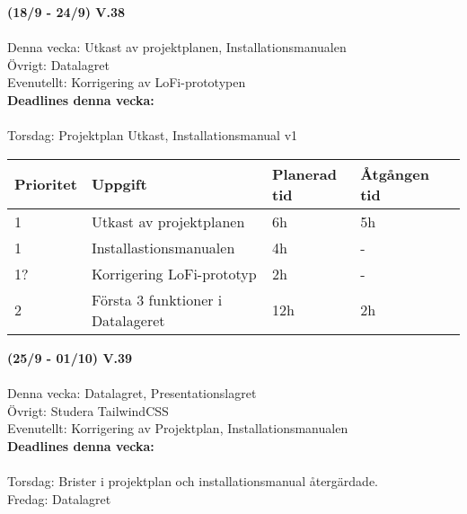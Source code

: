 \documentclass{TDP003mall}
\begin{document}
  \hrulefill
  \vspace{6em}

\textbf{(18/9 - 24/9) V.38}\\\\
  Denna vecka: Utkast av projektplanen, Installationsmanualen\\
  Övrigt: Datalagret\\
  Evenutellt: Korrigering av LoFi-prototypen\\

  \textbf{Deadlines denna vecka: }\\\\
  Torsdag: Projektplan Utkast, Installationsmanual v1


\begin{table}[]
  \begin{tabular}{|l|l|l|l|l|}
  \hline
   Prioritet & Uppgift                    & Planerad tid & Åtgången tid \\ \hline
   1         & Utkast av projektplanen  & 6h          & 5h          \\ \hline
   1         & Installastionsmanualen  & 4h           & -       \\ \hline
   1?        & Korrigering LoFi-prototyp &2h          & -       \\ \hline
   2         & Första 3 funktioner i Datalageret & 12h           & 2h          \\ \hline
  \end{tabular}
  \end{table}

  \hrulefill

  \textbf{(25/9 - 01/10) V.39}\\\\
  Denna vecka: Datalagret, Presentationslagret\\
  Övrigt: Studera TailwindCSS\\
  Evenutellt: Korrigering av Projektplan, Installationsmanualen\\

  \textbf{Deadlines denna vecka: }\\\\
  Torsdag: Brister i projektplan och installationsmanual återgärdade.\\
  Fredag: Datalagret
\end{document}
